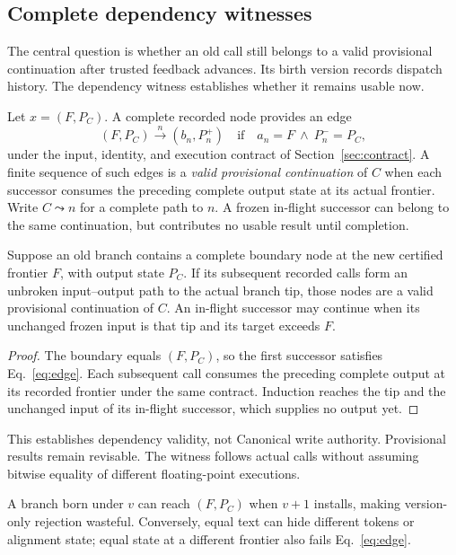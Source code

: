 \subsection{Complete dependency witnesses}
The central question is whether an old call still belongs to a valid
provisional continuation after trusted feedback advances. Its birth version
records dispatch history. The dependency witness establishes whether it
remains usable now.

Let $x=(F,P_C)$. A complete recorded node provides an edge
\begin{equation}
 (F,P_C)\xrightarrow{n}(b_n,P_n^+)
 \quad\text{if}\quad a_n=F\ \land\ P_n^-=P_C,
 \label{eq:edge}
\end{equation}
under the input, identity, and execution contract of
Section~\ref{sec:contract}. A finite sequence of such edges is a
\emph{valid provisional continuation} of $C$ when each successor consumes
the preceding complete output state at its actual frontier. Write
$C\leadsto n$ for a complete path to $n$. A frozen in-flight successor can
belong to the same continuation, but contributes no usable result until
completion.

\begin{proposition}
\label{prop:rebase}
Suppose an old branch contains a complete boundary node at the new certified
frontier $F$, with output state $P_C$. If its subsequent recorded calls form
an unbroken input--output path to the actual branch tip, those nodes are a
valid provisional continuation of $C$. An in-flight successor may continue
when its unchanged frozen input is that tip and its target exceeds $F$.
\end{proposition}
\begin{proof}
The boundary equals $(F,P_C)$, so the first successor satisfies
Eq.~\eqref{eq:edge}. Each subsequent call consumes the preceding complete
output at its recorded frontier under the same contract. Induction reaches
the tip and the unchanged input of its in-flight successor, which supplies
no output yet.
\end{proof}

This establishes dependency validity, not Canonical write authority.
Provisional results remain revisable. The witness follows actual calls
without assuming bitwise equality of different floating-point executions.

A branch born under $v$ can reach $(F,P_C)$ when $v+1$ installs, making
version-only rejection wasteful. Conversely, equal text can hide different
tokens or alignment state; equal state at a different frontier also fails
Eq.~\eqref{eq:edge}.

